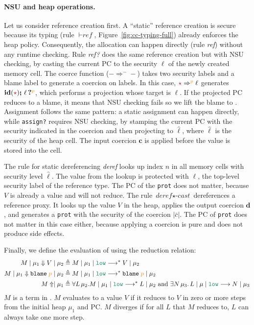 \paragraph{NSU and heap operations.} Let us consider reference creation
first. A ``static'' reference creation is secure because its typing (rule
${\vdash}\textit{ref}$, Figure~\ref{fig:cc-typing-full}) already enforces the
heap policy. Consequently, the allocation can happen directly (rule
\textit{ref}) without any runtime checking. Rule \textit{ref?} does the same
reference creation but with NSU checking, by casting the current PC to the
security $\ell$ of the newly created memory cell. The coerce function
(${-}\Rightarrow^{-}{-}$) takes two security labels and a blame label to
generate a coercion on labels. In this case, $\unk \Rightarrow^{\bl{p}} \ell$
generates $\id{\unk}\seq\proj{\ell}{p}$, which performs a projection whose
target is $\ell$. If the projected PC reduces to a blame, it means that NSU
checking fails so we lift the blame to \CC. Assignment follows the same pattern:
a static assignment can happen directly, while \texttt{assign?} requires NSU
checking, by stamping the current PC with the security indicated in the coercion
and then projecting to $\hat{\ell}$, where $\hat{\ell}$ is the security of the
heap cell. The input coercion $\bm{c}$ is applied before the value is stored
into the cell.

The rule for static dereferencing \textit{deref} looks up index $n$ in
all memory cells with security level $\hat{\ell}$. The value from the
lookup is protected with $\ell$, the top-level security label of the
reference type. The PC of the \texttt{prot} does not matter, because
$V$ is already a value and will not reduce.
The rule $\textit{deref}{\star}\textit{-cast}$ dereferences a reference proxy.
It looks up the value $V$ in the heap, applies the output coercion $\bm{d}$,
and generates a \texttt{prot} with the security of the coercion $|\bar{c}|$.
The PC of \texttt{prot} does not matter in this case either, because
applying a coercion is pure and does not produce side effects.

{\color{NavyBlue}  %
Finally, we define the evaluation of \CC using the reduction relation:
{\small
\begin{align*}
  M \mid \mu_1 \Downarrow V \mid \mu_2 &\triangleq \reducemult{M}{\mu_1}{\low}{V}{\mu_2} \\
  M \mid \mu_1 \Downarrow \blame{\bl{p}} \mid \mu_2 &\triangleq \reducemult{M}{\mu_1}{\low}{\blame{\bl{p}}}{\mu_2} \\
  M \Uparrow \mid \mu_1 &\triangleq \forall L\,\mu_2.\reducemult{M}{\mu_1}{\low}{L}{\mu_2} \text{~and~} \exists N\,\mu_3.\,\reduce{L}{\mu}{\low}{N}{\mu_3}
\end{align*}}
\noindent $M$ is a term in \CC. $M$ evaluates to a value $V$ if it reduces to
$V$ in zero or more steps from the initial heap $\mu_1$ and \low PC. $M$ diverges
if for all $L$ that $M$ reduces to, $L$ can always take one more step.
}  %
